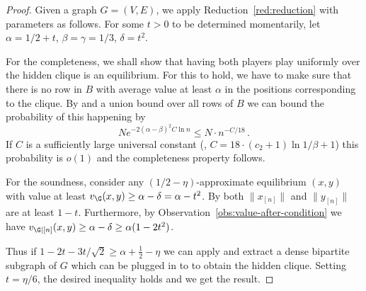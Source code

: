 \begin{proof}
  Given a graph $G = (V,E)$, we apply Reduction~\ref{red:reduction} with parameters as follows.
  For some $t>0$ to be determined momentarily, let $\alpha = {1}/{2} + t$,
  $\beta = \gamma = 1/3$, $\delta = t^2$.

  For the completeness, we shall show that having both players play
  uniformly over the hidden clique is an equilibrium.  For this to
  hold, we have to make sure that there is no row in $B$ with average
  value at least $\alpha$ in the positions corresponding to the
  clique.  By  and a union bound over all
  rows of $B$ we can bound the probability of this happening by
  $$N e^{-2 (\alpha-\beta)^2 C \ln n} \le N \cdot n^{-C/18}\,.$$ If $C$
  is a sufficiently large universal constant (\eg, $C = 18 \cdot
  (c_2+1) \ln 1/\beta + 1$) this probability is $o(1)$ and the
  completeness property follows.

  For the soundness, consider any $({1}/{2}-\eta)$-approximate equilibrium $(x,
  y)$ with value at least $v_{\G}(x,y) \ge \alpha - \delta=\alpha-t^2$.  By
   both $\|x_{[n]}\|$ and $\|y_{[n]}\|$ are
  at least $1-t$.  Furthermore, by
  Observation~\ref{obs:value-after-condition} we have $v_{\G|[n]}(x,y)
  \ge \alpha - \delta \ge \alpha(1 - 2t^2)$.

  Thus if $1 - 2t - 3t/\sqrt{2} \ge \alpha + \frac{1}{2} - \eta$ we can apply
   and extract a dense bipartite
  subgraph of $G$ which can be plugged in to
   to obtain the hidden clique.  Setting
  $t = \eta/6$, the desired inequality holds and we get the result.
%
\end{proof}

